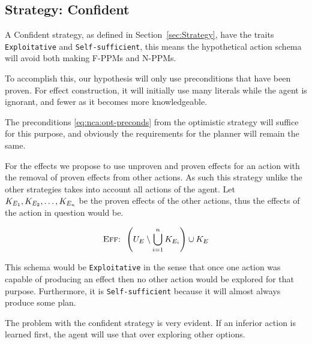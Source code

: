 \documentclass[\master/Master.tex]{subfiles}
\begin{document}
\subsection*{Strategy: Confident}

A Confident strategy, as defined in Section~\ref{sec:Strategy}, have the traits \texttt{Exploitative} and \texttt{Self-sufficient},
this means the hypothetical action schema will avoid both making F-PPMs and N-PPMs. 

To accomplish this, our hypothesis will only use preconditions that have been proven.
For effect construction, it will initially use many literals while the agent is ignorant, and fewer as it becomes more knowledgeable. 

The preconditions \eqref{eq:nca:opt-preconds} from the optimistic strategy will suffice for this purpose, and obviously the requirements for the planner will remain the same.

For the effects we propose to use unproven and proven effects for an action with the removal of proven effects from other actions. 
As such this strategy unlike the other strategies takes into account all actions of the agent.
Let $K_{E_1},K_{E_2},\dots,K_{E_n}$ be the proven effects of the other actions, thus the effects of the action in question would be.

\begin{equation}
		\textsc{Eff: } \left( U_E \setminus \bigcup \limits_{i = 1} ^n K_{E_i} \right) \cup K_E
\end{equation}

This schema would be \texttt{Exploitative} in the sense that once one action was capable of producing an effect then no other action would be explored for that purpose. 
Furthermore, it is \texttt{Self-sufficient} because it will almost always produce some plan.

The problem with the confident strategy is very evident. If an inferior action is learned first, the agent will use that over exploring other options.
\end{document}
